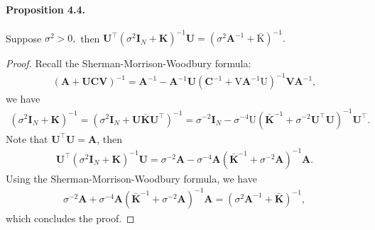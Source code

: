 \documentclass{article}
\begin{document}
\paragraph{Proposition 4.4.} Suppose $\sigma^2 > 0,$ then $\mathbf{U}^\top\left(\sigma^2\mathbf{I}_N + \mathbf{K}\right)^{-1}\mathbf{U} = \left(\sigma^2\mathbf{A}^{-1} + \bar{\mathrm{K}}\right)^{-1}.$
\begin{proof}
Recall the Sherman-Morrison-Woodbury formula:
\begin{align*}
	(\mathbf{A} + \mathbf{UCV})^{-1} = \mathbf{A}^{-1} - \mathbf{A}^{-1}\mathbf{U}\left(\mathbf{C}^{-1} + \mathrm{V}\mathbf{A}^{-1}\mathrm{U}\right)^{-1}\mathbf{V}\mathbf{A}^{-1},\tag{4.20}
\end{align*}
we have
\begin{align*}
	\left(\sigma^2\mathbf{I}_N + \mathbf{K}\right)^{-1} = \left(\sigma^2\mathbf{I}_N + \mathbf{U}\bar{\mathbf{K}}\mathbf{U}^\top\right)^{-1} = \sigma^{-2}\mathbf{I}_N - \sigma^{-4}\mathrm{U}\left(\bar{\mathbf{K}}^{-1} + \sigma^{-2}\mathbf{U}^\top\mathbf{U}\right)^{-1}\mathbf{U}^\top.\tag{4.21}
\end{align*}
Note that $\mathbf{U}^\top\mathbf{U} = \mathbf{A}$, then
\begin{align*}
	\mathbf{U}^\top\left(\sigma^2\mathbf{I}_N + \mathbf{K}\right)^{-1}\mathbf{U} = \sigma^{-2}\mathbf{A} - \sigma^{-4}\mathbf{A}\left(\bar{\mathbf{K}}^{-1} + \sigma^{-2}\mathbf{A}\right)^{-1}\mathbf{A}.\tag{4.22}
\end{align*}
Using the Sherman-Morrison-Woodbury formula, we have
\begin{align*}
	\sigma^{-2}\mathbf{A} + \sigma^{-4}\mathbf{A}\left(\bar{\mathbf{K}}^{-1} + \sigma^{-2}\mathbf{A}\right)^{-1}\mathbf{A} = \left(\sigma^2\mathbf{A}^{-1} + \bar{\mathbf{K}}\right)^{-1},\tag{4.23}
\end{align*}
which concludes the proof.
\end{proof} 
\end{document}
